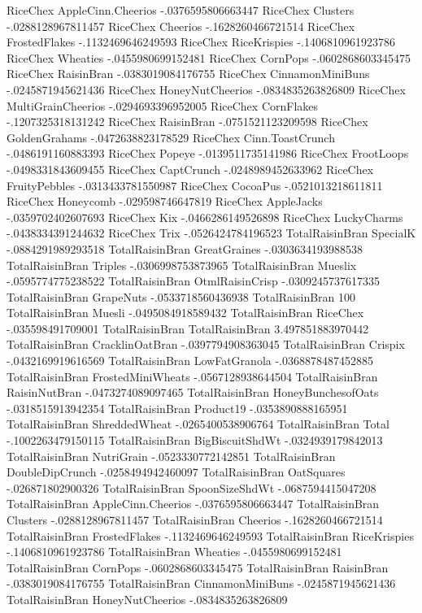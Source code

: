 RiceChex	AppleCinn.Cheerios	-.0376595806663447
RiceChex	Clusters	-.0288128967811457
RiceChex	Cheerios	-.1628260466721514
RiceChex	FrostedFlakes	-.1132469646249593
RiceChex	RiceKrispies	-.1406810961923786
RiceChex	Wheaties	-.0455980699152481
RiceChex	CornPops	-.0602868603345475
RiceChex	RaisinBran	-.0383019084176755
RiceChex	CinnamonMiniBuns	-.0245871945621436
RiceChex	HoneyNutCheerios	-.0834835263826809
RiceChex	MultiGrainCheerios	-.0294693396952005
RiceChex	CornFlakes	-.1207325318131242
RiceChex	RaisinBran	-.0751521123209598
RiceChex	GoldenGrahams	-.0472638823178529
RiceChex	Cinn.ToastCrunch	-.0486191160883393
RiceChex	Popeye	-.0139511735141986
RiceChex	FrootLoops	-.0498331843609455
RiceChex	CaptCrunch	-.0248989452633962
RiceChex	FruityPebbles	-.0313433781550987
RiceChex	CocoaPus	-.0521013218611811
RiceChex	Honeycomb	-.029598746647819
RiceChex	AppleJacks	-.0359702402607693
RiceChex	Kix	-.0466286149526898
RiceChex	LuckyCharms	-.0438334391244632
RiceChex	Trix	-.0526424784196523
TotalRaisinBran	SpecialK	-.0884291989293518
TotalRaisinBran	GreatGraines	-.0303634193988538
TotalRaisinBran	Triples	-.0306998753873965
TotalRaisinBran	Mueslix	-.0595774775238522
TotalRaisinBran	OtmlRaisinCrisp	-.0309245737617335
TotalRaisinBran	GrapeNuts	-.0533718560436938
TotalRaisinBran	100%
TotalRaisinBran	Muesli	-.0495084918589432
TotalRaisinBran	RiceChex	-.035598491709001
TotalRaisinBran	TotalRaisinBran	3.497851883970442
TotalRaisinBran	CracklinOatBran	-.0397794908363045
TotalRaisinBran	Crispix	-.0432169919616569
TotalRaisinBran	LowFatGranola	-.0368878487452885
TotalRaisinBran	FrostedMiniWheats	-.0567128938644504
TotalRaisinBran	RaisinNutBran	-.0473274089097465
TotalRaisinBran	HoneyBunchesofOats	-.0318515913942354
TotalRaisinBran	Product19	-.0353890888165951
TotalRaisinBran	ShreddedWheat	-.0265400538906764
TotalRaisinBran	Total	-.1002263479150115
TotalRaisinBran	BigBiscuitShdWt	-.0324939179842013
TotalRaisinBran	NutriGrain	-.0523330772142851
TotalRaisinBran	DoubleDipCrunch	-.0258494942460097
TotalRaisinBran	OatSquares	-.026871802900326
TotalRaisinBran	SpoonSizeShdWt	-.0687594415047208
TotalRaisinBran	AppleCinn.Cheerios	-.0376595806663447
TotalRaisinBran	Clusters	-.0288128967811457
TotalRaisinBran	Cheerios	-.1628260466721514
TotalRaisinBran	FrostedFlakes	-.1132469646249593
TotalRaisinBran	RiceKrispies	-.1406810961923786
TotalRaisinBran	Wheaties	-.0455980699152481
TotalRaisinBran	CornPops	-.0602868603345475
TotalRaisinBran	RaisinBran	-.0383019084176755
TotalRaisinBran	CinnamonMiniBuns	-.0245871945621436
TotalRaisinBran	HoneyNutCheerios	-.0834835263826809
